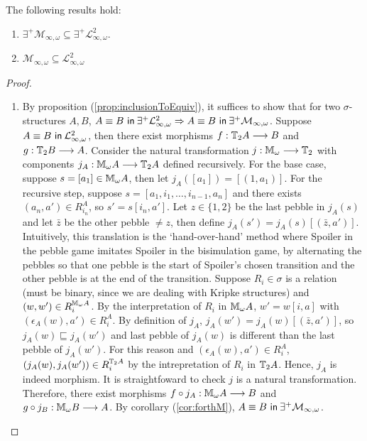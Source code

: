 \begin{prop}
The following results hold:
\begin{enumerate}[label=(\arabic*)]
\item $\exists^{+}\mathcal{M}_{\infty,\omega} \subseteq \exists^{+}\mathcal{L}^{2}_{\infty,\omega}$.
\item $\mathcal{M}_{\infty,\omega} \subseteq \mathcal{L}^{2}_{\infty,\omega}$
\end{enumerate}
\begin{proof}
\begin{enumerate}[label=(\arabic*)]
\item By proposition (\ref{prop:inclusionToEquiv}), it suffices to show that for two $\sigma$-structures $A,B$, ${A \equiv B \ \mathsf{in}\: \exists^{+}\mathcal{L}^{2}_{\infty,\omega}} \Rightarrow {A \equiv B \ \mathsf{in}\: \exists^{+}\mathcal{M}_{\infty,\omega}}$. Suppose ${A \equiv B \ \mathsf{in}\: \mathcal{L}^{2}_{\infty,\omega}}$, then there exist morphisms $f:{\mathbb{T}_{2}A} \longrightarrow B$ and $g:{\mathbb{T}_{2}B} \longrightarrow A$. Consider the natural transformation $j:{\mathbb{M}_{\omega}} \longrightarrow {\mathbb{T}_{2}}$ with components $j_{A}:{\mathbb{M}_{\omega}A} \longrightarrow {\mathbb{T}_{2}A}$ defined recursively. For the base case, suppose $s = [a_{1}] \in {\mathbb{M}_{\omega}A}$, then let $j_{A}([a_{1}]) = [(1,a_{1})]$. For the recursive step, suppose $s = [a_{1},i_{1},\dots,i_{n-1},a_{n}]$ and there exists $(a_{n},a') \in R_{i_{n}}^{A}$, so $s' = s[i_{n},a']$. Let $z \in \{1,2\}$ be the last pebble in $j_{A}(s)$ and let $\bar{z}$ be the other pebble $\not= z$, then define $j_{A}(s') = j_{A}(s)[(\bar{z},a')]$.  Intuitively, this translation is the `hand-over-hand' method where Spoiler in the pebble game imitates Spoiler in the bisimulation game, by alternating the pebbles so that one pebble is the start of Spoiler's chosen transition and the other pebble is at the end of the transition. Suppose $R_{i} \in \sigma$ is a relation (must be binary, since we are dealing with Kripke structures) and $(w,w') \in R_{i}^{{\mathbb{M}_{\omega}A}}$. By the interpretation of $R_{i}$ in ${\mathbb{M}_{\omega}A}$, $w' = w[i,a]$ with $(\epsilon_{A}(w),a') \in R_{i}^{A}$. By definition of $j_{A}$, $j_{A}(w') = j_{A}(w)[(\bar{z},a')]$, so $j_{A}(w) \sqsubseteq j_{A}(w')$ and last pebble of $j_{A}(w)$ is different than the last pebble of $j_{A}(w')$. For this reason and $(\epsilon_{A}(w),a') \in R_{i}^{A}$, $(j_{A}(w),j_{A}(w')) \in R_{i}^{{\mathbb{T}_{2}A}}$ by the intrepretation of $R_{i}$ in ${\mathbb{T}_{2}A}$. Hence, $j_{A}$ is indeed morphism. It is straightfoward to check $j$ is a natural transformation. Therefore, there exist morphisms $f \circ j_{A}: {\mathbb{M}_{\omega}A} \longrightarrow B$ and $g \circ j_{B}:{\mathbb{M}_{\omega}B} \longrightarrow A$. By corollary (\ref{cor:forthM}), ${A \equiv B \ \mathsf{in}\: \exists^{+}\mathcal{M}_{\infty,\omega}}$. 

\end{enumerate}
\end{proof}
\end{prop}
